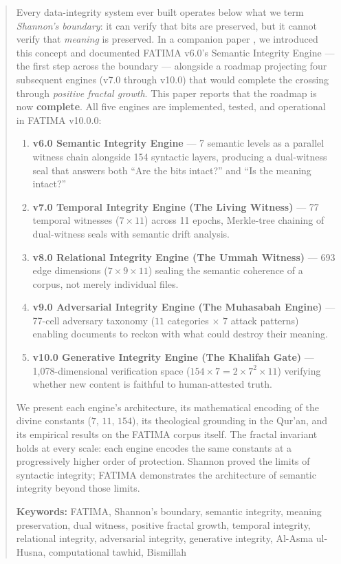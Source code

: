 \documentclass[11pt,a4paper]{article}
\begin{document}
\begin{abstract}
\noindent Every data-integrity system ever built operates below what we term \textit{Shannon's boundary}: it can verify that bits are preserved, but it cannot verify that \textit{meaning} is preserved. In a companion paper \cite{arfeen2026crossing}, we introduced this concept and documented FATIMA v6.0's Semantic Integrity Engine --- the first step across the boundary --- alongside a roadmap projecting four subsequent engines (v7.0 through v10.0) that would complete the crossing through \textit{positive fractal growth}. This paper reports that the roadmap is now \textbf{complete}. All five engines are implemented, tested, and operational in FATIMA v10.0.0:

\begin{enumerate}[nosep,leftmargin=2em]
    \item \textbf{v6.0 Semantic Integrity Engine} --- 7 semantic levels as a parallel witness chain alongside 154 syntactic layers, producing a dual-witness seal that answers both ``Are the bits intact?'' and ``Is the meaning intact?''
    \item \textbf{v7.0 Temporal Integrity Engine (The Living Witness)} --- 77 temporal witnesses ($7 \times 11$) across 11 epochs, Merkle-tree chaining of dual-witness seals with semantic drift analysis.
    \item \textbf{v8.0 Relational Integrity Engine (The Ummah Witness)} --- 693 edge dimensions ($7 \times 9 \times 11$) sealing the semantic coherence of a corpus, not merely individual files.
    \item \textbf{v9.0 Adversarial Integrity Engine (The Muhasabah Engine)} --- 77-cell adversary taxonomy ($11$ categories $\times$ $7$ attack patterns) enabling documents to reckon with what could destroy their meaning.
    \item \textbf{v10.0 Generative Integrity Engine (The Khalifah Gate)} --- 1,078-dimensional verification space ($154 \times 7 = 2 \times 7^2 \times 11$) verifying whether new content is faithful to human-attested truth.
\end{enumerate}

\noindent We present each engine's architecture, its mathematical encoding of the divine constants ($7$, $11$, $154$), its theological grounding in the Qur'an, and its empirical results on the FATIMA corpus itself. The fractal invariant holds at every scale: each engine encodes the same constants at a progressively higher order of protection. Shannon proved the limits of syntactic integrity; FATIMA demonstrates the architecture of semantic integrity beyond those limits.

\vspace{0.5em}
\noindent\textbf{Keywords:} FATIMA, Shannon's boundary, semantic integrity, meaning preservation, dual witness, positive fractal growth, temporal integrity, relational integrity, adversarial integrity, generative integrity, Al-Asma ul-Husna, computational tawhid, Bismillah
\end{abstract}
\end{document}
